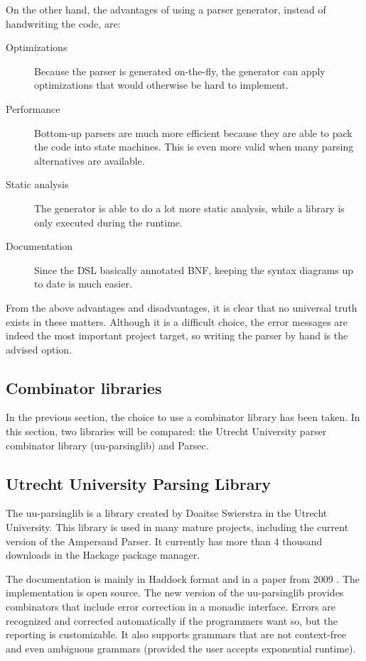 \noindent
On the other hand, the advantages of using a parser generator, instead of handwriting the code, are:
\begin{description}
	\item[Optimizations] Because the parser is generated on-the-fly, the generator can apply optimizations that would otherwise be hard to implement.
	\item[Performance] Bottom-up parsers are much more efficient because they are able to pack the code into state machines.
		This is even more valid when many parsing alternatives are available.
	\item[Static analysis] The generator is able to do a lot more static analysis, while a library is only executed during the runtime.
	\item[Documentation] Since the DSL basically annotated BNF, keeping the syntax diagrams up to date is much easier.
\end{description}

\noindent
From the above advantages and disadvantages, it is clear that no universal truth exists in these matters.
Although it is a difficult choice, the error messages are indeed the most important project target, so writing the parser by hand is the advised option.

\subsection{Combinator libraries}
In the previous section, the choice to use a combinator library has been taken.
In this section, two libraries will be compared: the Utrecht University parser combinator library (uu-parsinglib) and Parsec.

\subsection{Utrecht University Parsing Library}
%
The uu-parsinglib is a library created by Doaitse Swierstra in the Utrecht University.
This library is used in many mature projects, including the current version of the Ampersand Parser.
It currently has more than 4 thousand downloads in the Hackage package manager.

The documentation is mainly in Haddock format and in a paper from 2009 \cite{uu-doc}.
The implementation is open source.
The new version of the uu-parsinglib provides combinators that include error correction in a monadic interface.
Errors are recognized and corrected automatically if the programmers want so, but the reporting is customizable.
It also supports grammars that are not context-free and even ambiguous grammars (provided the user accepts exponential runtime).


